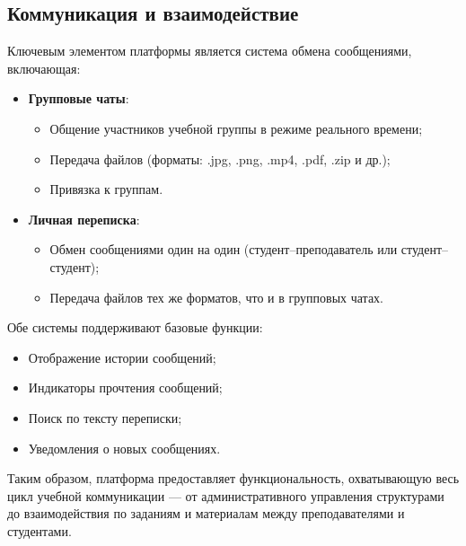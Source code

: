 \subsection{Коммуникация и взаимодействие}

Ключевым элементом платформы является система обмена сообщениями, включающая:
\begin{itemize}
  \item \textbf{Групповые чаты}:
    \begin{itemize}
      \item Общение участников учебной группы в режиме реального времени;
      \item Передача файлов (форматы: .jpg, .png, .mp4, .pdf, .zip и др.);
      \item Привязка к группам.
    \end{itemize}
  \item \textbf{Личная переписка}:
    \begin{itemize}
      \item Обмен сообщениями один на один (студент–преподаватель или студент–студент);
      \item Передача файлов тех же форматов, что и в групповых чатах.
    \end{itemize}
\end{itemize}

Обе системы поддерживают базовые функции:
\begin{itemize}
  \item Отображение истории сообщений;
  \item Индикаторы прочтения сообщений;
  \item Поиск по тексту переписки;
  \item Уведомления о новых сообщениях.
\end{itemize}

Таким образом, платформа предоставляет функциональность, охватывающую весь цикл учебной коммуникации — от административного управления структурами до взаимодействия по заданиям и материалам между преподавателями и студентами.
